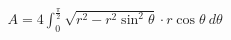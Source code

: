 \documentclass[preview]{standalone}
\begin{document}
\begin{align*}
A=4\int_{0}^{\frac{\pi}{2}}\sqrt{r^{2}-r^{2}\sin^{2}\theta}\cdot r\cos\theta\ d\theta
\end{align*}
\end{document}
